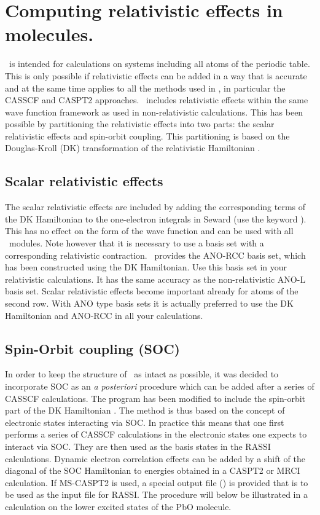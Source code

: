 \section{Computing relativistic effects in molecules.}
\label{TUT:sec:SOC}
\molcasthis\ is intended for calculations on systems including all atoms of the
periodic table. This is only possible if relativistic effects can be added in a
way that is accurate and at the same time applies to all the methods used in
\molcasthis, in particular the CASSCF and CASPT2 approaches. \molcasthis\ 
includes relativistic effects within the same wave function framework as used in
non-relativistic calculations. This has been possible by partitioning the
relativistic effects into two parts: the scalar relativistic effects and
spin-orbit coupling. This partitioning is based on the Douglas-Kroll (DK)
transformation of the relativistic Hamiltonian \cite{Douglas:74,Hess:86}.

\subsection{Scalar relativistic effects}
The scalar relativistic effects are included by adding the corresponding terms
of the DK Hamiltonian to the one-electron integrals in Seward (use
the keyword \keyword{Douglas-Kroll}). This has no effect on the form of the wave
function and can be used with all \molcasthis\ modules. Note however that it is
necessary to use a basis set with a corresponding relativistic contraction. 
\molcasthis\ provides the ANO-RCC basis set, which has been constructed using 
the DK Hamiltonian. Use this basis set in your relativistic calculations. It has
the same accuracy as the non-relativistic ANO-L basis set. Scalar relativistic
effects become important already for atoms of the second row. With ANO type
basis sets it is actually preferred to use the DK Hamiltonian and ANO-RCC in all
your calculations.

\subsection{Spin-Orbit coupling (SOC)}
In order to keep the structure of \molcas\ as intact as possible, it was decided
to incorporate SOC as an {\em a posteriori} procedure which can be added after
a series of CASSCF calculations. The program \program{RASSI} has been modified 
to include the spin-orbit part of the DK Hamiltonian \cite{Malmqvist:02a}. The 
method is thus based on the concept of electronic states interacting via SOC.
In practice this means that one first performs a series of CASSCF calculations
in the electronic states one expects to interact via SOC. They are then used as
the basis states in the RASSI calculations. Dynamic electron correlation effects
can be added by a shift of the diagonal of the SOC Hamiltonian to energies
obtained in a CASPT2 or MRCI calculation. If MS-CASPT2 is used, a special
output file  (\file{JOBMIX}) is provided that is to be used as the input file 
for RASSI. The procedure will below be illustrated in a calculation on the lower
excited states of the PbO molecule. 

